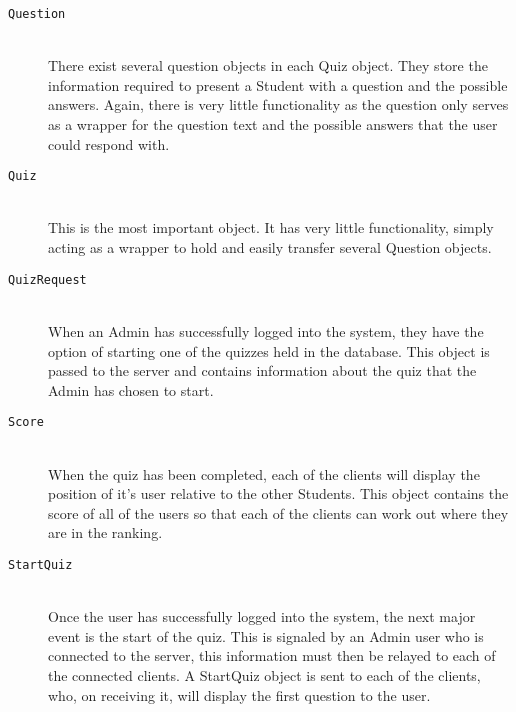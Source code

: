 \begin{description}
	\item[\texttt{Question}] \hfill \\ There exist several question objects in
		each Quiz object. They store the information required to present a
		Student with a question and the possible answers. Again, there is very
		little functionality as the question only serves as a wrapper for the
		question text and the possible answers that the user could respond
		with.

	\item[\texttt{Quiz}] \hfill \\ This is the most important object. It has
		very little functionality, simply acting as a wrapper to hold and
		easily transfer several Question objects.

	\item[\texttt{QuizRequest}] \hfill \\ When an Admin has successfully logged
		into the system, they have the option of starting one of the quizzes
		held in the database. This object is passed to the server and contains
		information about the quiz that the Admin has chosen to start.

	\item[\texttt{Score}] \hfill \\ When the quiz has been completed, each of
		the clients will display the position of it's user relative to the
		other Students. This object contains the score of all of the users so
		that each of the clients can work out where they are in the ranking.

	\item[\texttt{StartQuiz}] \hfill \\ Once the user has successfully logged
		into the system, the next major event is the start of the quiz. This is
		signaled by an Admin user who is connected to the server, this
		information must then be relayed to each of the connected clients. A
		StartQuiz object is sent to each of the clients, who, on receiving it,
		will display the first question to the user.

\end{description}
